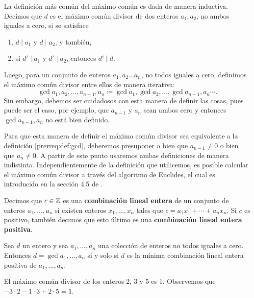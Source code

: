 La definición más común del máximo común es dada de manera inductiva. Decimos que $d$ es el máximo
común divisor de dos enteros $a_1, a_2$, no ambos iguales a cero, si se satisface
\begin{enumerate}
	\item $d \mid a_1$ y $d \mid a_2$, y también,
	\item si $d' \mid a_1$ y $d' \mid a_2$, entonces $d' \mid d$.
\end{enumerate}
Luego, para un conjunto de enteros $a_1, a_2 \ldots a_n$, no todos iguales a cero, definimos el máximo común
divisor entre ellos de manera iterativa:
\begin{equation*}
	\gcd{a_1, a_2, \ldots, a_{n-1}, a_n} \coloneq \gcd{a_1, \gcd{a_2, \ldots, \gcd{a_{n-1}, a_n} \cdots }}.
\end{equation*}
Sin embargo, debemos ser cuidadosos con esta manera de definir las cosas, pues puede ser el caso,
por ejemplo, que $a_{n-1}$ y $a_n$ sean ambos cero y entonces $\gcd{a_{n-1}, a_n}$ no está bien definido.

Para que esta manera de definir el máximo común divisor sea equivalente a la definición
\ref{prerreq:def:gcd}, deberemos presuponer o bien que $a_{n - 1} \neq 0$ o bien que $a_n \neq 0$. A
partir de este punto usaremos ambas definiciones de manera indistinta. Independientemente de la
definición que utilicemos, es posible calcular el máximo común divisor a través del algoritmo
de Euclides, el cual es introducido en la sección 4.5 de \cite{knuth}.


\begin{definition}
	Decimos que $c \in \mathbb{Z}$ es una \textbf{combinación lineal entera} de un conjunto de enteros $a_1, \ldots,
	a_n$ si existen enteros $x_1, \ldots, x_n$ tales que $c = a_1x_1 + \cdots + a_nx_n$. Si $c$ es
	positivo, también decimos que esto último es una \textbf{combinación lineal entera positiva}.
\end{definition}
\begin{theorem}
	\label{prerreq:th:bezout}
	Sea $d$ un entero y sea $a_1, \ldots, a_n$ una colección de enteros no todos iguales a cero.
	Entonces $d = \gcd{a_1, \ldots, a_n}$ si y solo si $d$ es la mínima combinación lineal entera
	positiva de $a_1, \ldots, a_n$.
\end{theorem}
\begin{example}
	El máximo común divisor de los enteros 2, 3 y 5 es 1. Observemos que $-3\cdot 2 - 1\cdot 3 +
	2\cdot 5 = 1$.
\end{example}

